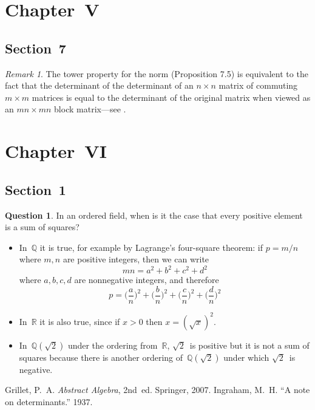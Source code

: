 \documentclass[letterpaper,12pt]{article}
\newcommand{\Q}{\mathbb{Q}}
\newcommand{\R}{\mathbb{R}}
\theoremstyle{definition}
\newtheorem*{quest}{Question}
\theoremstyle{remark}
\newtheorem*{rmk}{Remark}
\theoremstyle{plain}
\begin{document}
\section*{Chapter~V}
\subsection*{Section~7}
\begin{rmk}
The tower property for the norm (Proposition 7.5) is equivalent to the fact that the determinant of the determinant of an \(n\times n\) matrix of commuting \(m\times m\) matrices is equal to the determinant of the original matrix when viewed as an \(mn\times mn\) block matrix---see \cite{ingraham}.
\end{rmk}

\section*{Chapter~VI}
\subsection*{Section~1}
\begin{quest}
In an ordered field, when is it the case that every positive element is a sum of squares?
\end{quest}
\begin{itemize}
\item  In~\(\Q\) it is true, for example by Lagrange's four-square theorem: if \(p=m/n\) where \(m,n\) are positive integers, then we can write
\[mn=a^2+b^2+c^2+d^2\]
where \(a,b,c,d\) are nonnegative integers, and therefore
\[p=\Biggl(\frac{a}{n}\Biggr)^2+\Biggl(\frac{b}{n}\Biggr)^2+\Biggl(\frac{c}{n}\Biggr)^2+\Biggl(\frac{d}{n}\Biggr)^2\]

\item In~\(\R\) it is also true, since if \(x>0\) then \(x=(\sqrt{x})^2\).

\item In~\(\Q(\sqrt{2})\) under the ordering from~\(\R\), \(\sqrt{2}\)~is positive but it is not a sum of squares because there is another ordering of~\(\Q(\sqrt{2})\) under which \(\sqrt{2}\)~is negative.
\end{itemize}

\begin{thebibliography}{0}
 Grillet, P.~A. \textit{Abstract Algebra}, 2nd~ed. Springer, 2007.
 Ingraham, M.~H. ``A note on determinants.'' 1937.
\end{thebibliography}
\end{document}
